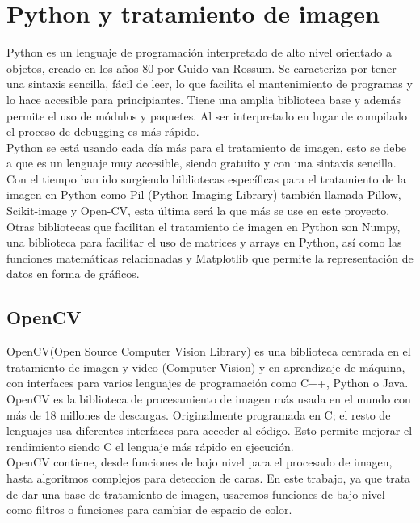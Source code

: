 \documentclass[a4paper,12pt]{report}
\begin{document}
\section{Python y tratamiento de imagen}

Python es un lenguaje de programación interpretado de alto nivel orientado a objetos, creado en los años 80 por Guido van Rossum. Se caracteriza por tener una sintaxis sencilla, fácil de leer, lo que facilita el mantenimiento de programas y lo hace accesible para principiantes. Tiene una amplia biblioteca base y además permite el uso de módulos y paquetes. Al ser interpretado en lugar de compilado el proceso de debugging es más rápido.\\

 Python se está usando cada día más para el tratamiento de imagen, esto se debe a que es un lenguaje muy accesible, siendo gratuito y con una sintaxis sencilla. Con el tiempo han ido surgiendo bibliotecas específicas para el tratamiento de la imagen en Python como Pil (Python Imaging Library) también llamada Pillow, Scikit-image y Open-CV, esta última será la que más se use en este proyecto.\\

Otras bibliotecas que facilitan el tratamiento de imagen en Python son Numpy, una biblioteca para facilitar el uso de matrices y arrays en Python, así como las funciones matemáticas relacionadas y Matplotlib que permite  la representación de datos en forma de gráficos.\\

\subsection{OpenCV}

OpenCV(Open Source Computer Vision Library) es una biblioteca centrada en el tratamiento de imagen y video (Computer Vision) y en aprendizaje de máquina, con interfaces para varios lenguajes de programación como C++, Python o Java. OpenCV es la biblioteca de procesamiento de imagen más usada en el mundo con más de 18 millones de descargas. Originalmente programada en C; el resto de lenguajes usa diferentes interfaces para acceder al código. Esto permite mejorar el rendimiento siendo C el lenguaje más rápido en ejecución.\\

OpenCV contiene,  desde funciones de bajo nivel para el procesado de imagen, hasta algoritmos complejos para deteccion de caras. En este trabajo, ya que trata de dar una base de tratamiento de imagen, usaremos funciones de bajo nivel como filtros o funciones para cambiar de espacio de color.\\
\end{document}
